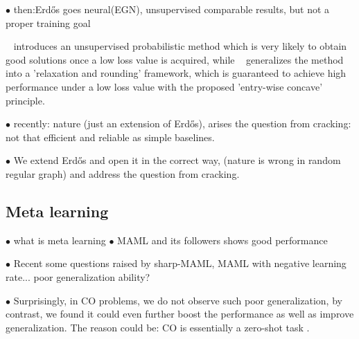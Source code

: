$\bullet$ then:Erd\H{o}s goes neural(EGN), unsupervised comparable results, but not a proper training goal 

~\cite{karalias2020erdos} introduces an unsupervised probabilistic method which is very likely to obtain good solutions once a low loss value is acquired, while ~\cite{wang2022unsupervised} generalizes the method into a 'relaxation and rounding' framework, which is guaranteed to achieve high performance under a low loss value with the proposed 'entry-wise concave' principle. 


$\bullet$ recently: nature (just an extension of Erd\H{o}s), arises the question from cracking: not that efficient and reliable as simple baselines.  

$\bullet$ We extend Erd\H{o}s and open it in the correct way, (nature is wrong in random regular graph) and address the question from cracking.  

\subsection{Meta learning}
$\bullet$ what is meta learning 
$\bullet$ MAML and its followers shows good performance

$\bullet$ Recent some questions raised by sharp-MAML, MAML with negative learning rate... poor generalization ability? 

$\bullet$ Surprisingly, in CO problems, we do not observe such poor generalization, by contrast, we found it could even further boost the performance as well as improve generalization. The reason could be: CO is essentially a zero-shot task .
\fi